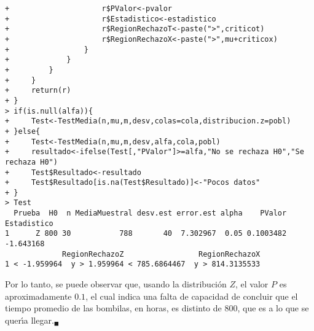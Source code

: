 \begin{solucion}
\begin{verbatim}
+                     r$PValor<-pvalor
+                     r$Estadistico<-estadistico
+                     r$RegionRechazoT<-paste(">",criticot)
+                     r$RegionRechazoX<-paste(">",mu+criticox)
+                 }
+             }
+         }
+     }
+     return(r)
+ }
> if(is.null(alfa)){
+     Test<-TestMedia(n,mu,m,desv,colas=cola,distribucion.z=pobl)
+ }else{
+     Test<-TestMedia(n,mu,m,desv,alfa,cola,pobl)
+     resultado<-ifelse(Test[,"PValor"]>=alfa,"No se rechaza H0","Se rechaza H0")
+     Test$Resultado<-resultado
+     Test$Resultado[is.na(Test$Resultado)]<-"Pocos datos"
+ }
> Test
  Prueba  H0  n MediaMuestral desv.est error.est alpha    PValor Estadistico
1      Z 800 30           788       40  7.302967  0.05 0.1003482   -1.643168
             RegionRechazoZ                 RegionRechazoX
1 < -1.959964  y > 1.959964 < 785.6864467  y > 814.3135533
 \end{verbatim}
 \vspace{-0.5cm}
 Por lo tanto, se puede observar que, usando la distribuci\'on $Z$, el valor $P$ es aproximadamente $0.1$, el cual indica una falta de capacidad de concluir que el tiempo promedio de las bombilas, en horas, es distinto de $800$, que es a lo que se quer\'{\i}a llegar.${}_{\blacksquare}$
\end{solucion}
